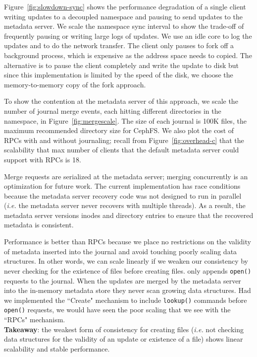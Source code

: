 Figure~\ref{fig:slowdown-sync} shows the performance degradation of a single
client writing updates to a decoupled namespace and pausing to send updates to
the metadata server. We scale the namespace sync interval to show the trade-off
of frequently pausing or writing large logs of updates.  We use an idle core to
log the updates and to do the network transfer. The client only pauses to fork
off a background process, which is expensive as the address space needs to
copied. The alternative is to pause the client completely and write the update
to disk but since this implementation is limited by the speed of the disk, we
choose the memory-to-memory copy of the fork approach.

To show the contention at the metadata server of this approach, we scale the
number of journal merge events, each hitting different directories in the
namespace, in Figure~\ref{fig:mergescale}. The size of each journal is 100K
files, the maximum recommended directory size for CephFS. We also plot the cost
of RPCs with and without journaling; recall from Figure~\ref{fig:overhead-c}
that the scalability that max number of clients that the default metadata
server could support with RPCs is 18.

Merge requests are serialized at the metadata server; merging concurrently is
an optimization for future work. The current implementation has race conditions
because the metadata server recovery code was not designed to run in parallel
({\it i.e.} the metadata server never recovers with multiple threads). As a
result, the metadata server versions inodes and directory entries to ensure
that the recovered metadata is consistent.

Performance is better than RPCs because we place no restrictions on the
validity of metadata inserted into the journal and avoid touching poorly
scaling data structures. In other words, we can scale linearly if we weaken our
consistency by never checking for the existence of files before creating files.
only appends \texttt{open()} requests to the journal. When the updates are
merged by the metadata server into the in-memory metadata store they never scan
growing data structures.  Had we implemented the ``Create" mechanism to include
\texttt{lookup()} commands before \texttt{open()} requests, we would have seen
the poor scaling that we see with the ``RPCs" mechanism.\\

\noindent\textbf{Takeaway}: the weakest form of consistency for creating files
({\it i.e.} not checking data structures for the validity of an update or
existence of a file) shows linear scalability and stable performance.


